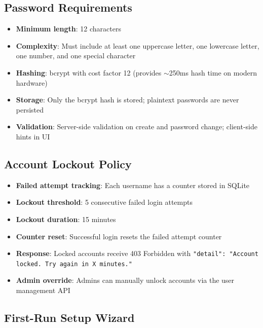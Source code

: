 \documentclass[11pt,a4paper]{article}
\newcommand{\inlinecode}[1]{\texttt{\small\colorbox{ctCodeBg}{#1}}}
\begin{document}
\subsection{Password Requirements}

\begin{reqbox}
\begin{itemize}
    \item \textbf{Minimum length}: 12 characters
    \item \textbf{Complexity}: Must include at least one uppercase letter, one lowercase letter, one number, and one special character
    \item \textbf{Hashing}: bcrypt with cost factor 12 (provides $\sim$250ms hash time on modern hardware)
    \item \textbf{Storage}: Only the bcrypt hash is stored; plaintext passwords are never persisted
    \item \textbf{Validation}: Server-side validation on create and password change; client-side hints in UI
\end{itemize}
\end{reqbox}

\subsection{Account Lockout Policy}

\begin{itemize}
    \item \textbf{Failed attempt tracking}: Each username has a counter stored in SQLite
    \item \textbf{Lockout threshold}: 5 consecutive failed login attempts
    \item \textbf{Lockout duration}: 15 minutes
    \item \textbf{Counter reset}: Successful login resets the failed attempt counter
    \item \textbf{Response}: Locked accounts receive 403 Forbidden with \inlinecode{"detail": "Account locked. Try again in X minutes."}
    \item \textbf{Admin override}: Admins can manually unlock accounts via the user management API
\end{itemize}

\subsection{First-Run Setup Wizard}
\end{document}
